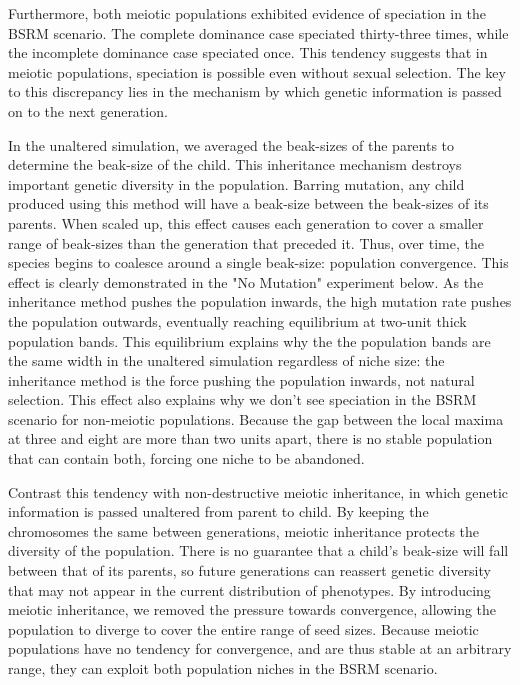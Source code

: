 \documentclass[conference]{IEEEtran}
\begin{document}
Furthermore, both meiotic populations exhibited evidence of speciation in the BSRM scenario. The complete dominance case speciated thirty-three times, while the incomplete dominance case speciated once. This tendency suggests that in meiotic populations, speciation is possible even without sexual selection. The key to this discrepancy lies in the mechanism by which genetic information is passed on to the next generation. 

In the unaltered simulation, we averaged the beak-sizes of the parents to determine the beak-size of the child. This inheritance mechanism destroys important genetic diversity in the population. Barring mutation, any child produced using this method will have a beak-size between the beak-sizes of its parents. When scaled up, this effect causes each generation to cover a smaller range of beak-sizes than the generation that preceded it. Thus, over time, the species begins to coalesce around a single beak-size: population convergence. This effect is clearly demonstrated in the "No Mutation" experiment below. As the inheritance method pushes the population inwards, the high mutation rate pushes the population outwards, eventually reaching equilibrium at two-unit thick population bands. This equilibrium explains why the the population bands are the same width in the unaltered simulation regardless of niche size: the inheritance method is the force pushing the population inwards, not natural selection. This effect also explains why we don’t see speciation in the BSRM scenario for non-meiotic populations. Because the gap between the local maxima at three and eight are more than two units apart, there is no stable population that can contain both, forcing one niche to be abandoned.

Contrast this tendency with non-destructive meiotic inheritance, in which genetic information is passed unaltered from parent to child. By keeping the chromosomes the same between generations, meiotic inheritance protects the diversity of the population. There is no guarantee that a child’s beak-size will fall between that of its parents, so future generations can reassert genetic diversity that may not appear in the current distribution of phenotypes. By introducing meiotic inheritance, we removed the pressure towards convergence, allowing the population to diverge to cover the entire range of seed sizes. Because meiotic populations have no tendency for convergence, and are thus stable at an arbitrary range, they can exploit both population niches in the BSRM scenario.
\end{document}
